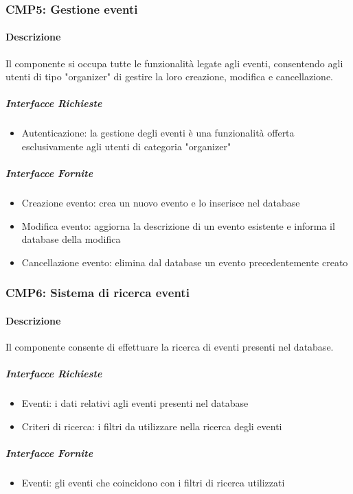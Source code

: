 \documentclass[9pt]{extarticle}
\begin{document}
\subsubsection*{CMP5: Gestione eventi}
\paragraph{Descrizione}
Il componente si occupa tutte le funzionalità legate agli eventi, consentendo agli utenti di tipo "organizer" di gestire la loro creazione, modifica e cancellazione.

\subparagraph{Interfacce Richieste}
\begin{itemize}
	\item Autenticazione: la gestione degli eventi è una funzionalità offerta esclusivamente agli utenti di categoria "organizer"
\end{itemize}
\subparagraph{Interfacce Fornite}
\begin{itemize}
	\item Creazione evento: crea un nuovo evento e lo inserisce nel database
	\item Modifica evento: aggiorna la descrizione di un evento esistente e informa il database della modifica
	\item Cancellazione evento: elimina dal database un evento precedentemente creato
\end{itemize}

\subsubsection*{CMP6: Sistema di ricerca eventi}
\paragraph{Descrizione}
Il componente consente di effettuare la ricerca di eventi presenti nel database.
\subparagraph{Interfacce Richieste}
\begin{itemize}
	\item Eventi: i dati relativi agli eventi presenti nel database
	\item Criteri di ricerca: i filtri da utilizzare nella ricerca degli eventi
\end{itemize}
\subparagraph{Interfacce Fornite}
\begin{itemize}
	\item Eventi: gli eventi che coincidono con i filtri di ricerca utilizzati
\end{itemize}
\end{document}
